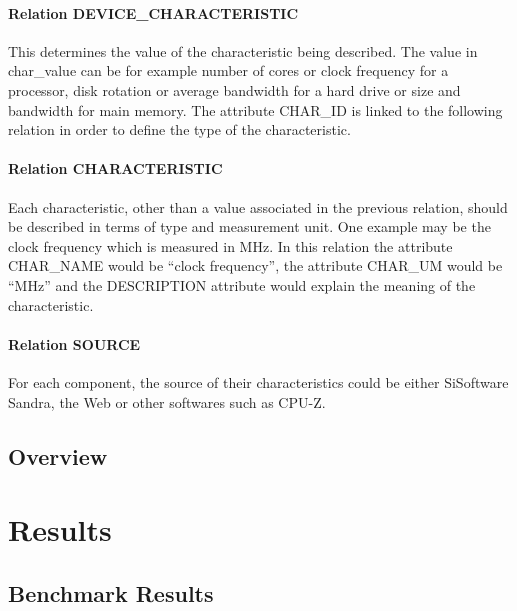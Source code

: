         \paragraph*{Relation DEVICE_CHARACTERISTIC}
            This determines the value of the characteristic being described. The value in char_value can be for example number of cores or clock frequency for a processor, disk rotation or average bandwidth for a hard drive or size and bandwidth for main memory. The attribute CHAR_ID is linked to the following relation in order to define the type of the characteristic.
            
        \paragraph*{Relation CHARACTERISTIC}
            Each characteristic, other than a value associated in the previous relation, should be described in terms of type and measurement unit. One example may be the clock frequency which is measured in MHz. In this relation the attribute CHAR_NAME would be ``clock frequency'', the attribute CHAR_UM would be ``MHz'' and the DESCRIPTION attribute would explain the meaning of the characteristic.
            
        \paragraph*{Relation SOURCE}
            For each component, the source of their characteristics could be either SiSoftware Sandra, the Web or other softwares such as CPU-Z.
                        
\subsection{Overview} \label{sec4:analysis_overview}

\section{Results} \label{sec4:results}
\subsection{Benchmark Results} \label{sec4:benchmark_results}

